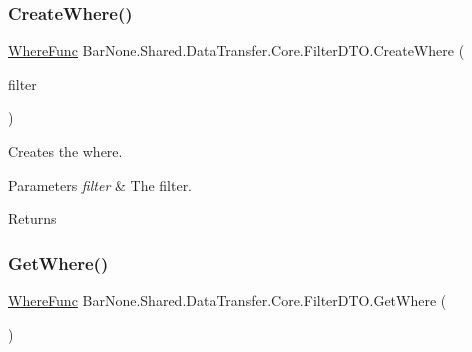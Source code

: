 \subsubsection{\texorpdfstring{Create\+Where()}{CreateWhere()}}
{\footnotesize\ttfamily \mbox{\hyperlink{class_bar_none_1_1_shared_1_1_data_transfer_1_1_core_1_1_filter_d_t_o_abde020b2934ca1c07441a24e135c81e2}{Where\+Func}} Bar\+None.\+Shared.\+Data\+Transfer.\+Core.\+Filter\+D\+T\+O.\+Create\+Where (\begin{DoxyParamCaption}\item[{\mbox{\hyperlink{class_bar_none_1_1_shared_1_1_data_transfer_1_1_core_1_1_filter_1_1_where_filter}{Where\+Filter}}}]{filter }\end{DoxyParamCaption})\hspace{0.3cm}{\ttfamily [private]}}



Creates the where. 


\begin{DoxyParams}{Parameters}
{\em filter} & The filter.\\
\hline
\end{DoxyParams}
\begin{DoxyReturn}{Returns}

\end{DoxyReturn}
\mbox{\label{class_bar_none_1_1_shared_1_1_data_transfer_1_1_core_1_1_filter_d_t_o_a216f4f3b1a7c08fc7f158c13f18564f0}} 
\subsubsection{\texorpdfstring{Get\+Where()}{GetWhere()}}
{\footnotesize\ttfamily \mbox{\hyperlink{class_bar_none_1_1_shared_1_1_data_transfer_1_1_core_1_1_filter_d_t_o_abde020b2934ca1c07441a24e135c81e2}{Where\+Func}} Bar\+None.\+Shared.\+Data\+Transfer.\+Core.\+Filter\+D\+T\+O.\+Get\+Where (\begin{DoxyParamCaption}{ }\end{DoxyParamCaption})}



